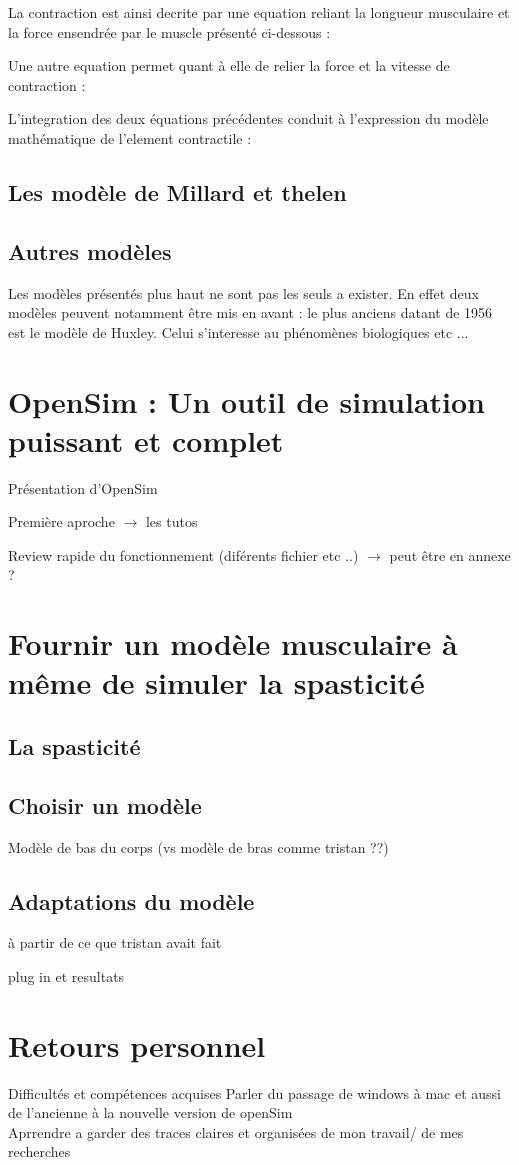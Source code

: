 La contraction est ainsi decrite par une equation reliant la longueur musculaire et la force ensendrée par le muscle présenté ci-dessous : 


Une autre equation permet quant à elle de relier la force et la vitesse de contraction : 


L'integration des deux équations précédentes conduit à l'expression du modèle mathématique de l'element contractile : 



\section{Les modèle de Millard et thelen}

\section{Autres modèles}
Les modèles présentés plus haut ne sont pas les seuls a exister. En effet deux modèles peuvent notamment être mis en avant : le plus anciens datant de 1956 est le modèle de Huxley. Celui s'interesse au phénomènes biologiques etc ... \cite{huxley_muscle_1957}
\chapter{OpenSim : Un outil de simulation puissant et complet}

Présentation d'OpenSim 

Première aproche $\rightarrow$ les tutos

Review rapide du fonctionnement (diférents fichier etc ..) $\rightarrow$ peut être en annexe ? 
\chapter{Fournir un modèle musculaire à même de simuler la spasticité}
\section{La spasticité}
\section{Choisir un modèle}
Modèle de bas du corps (vs modèle de bras comme tristan ??)
\section{Adaptations du modèle}
à partir de ce que tristan avait fait 

plug in et resultats 
\chapter{Retours personnel}
Difficultés et compétences acquises 
Parler du passage de windows à mac et aussi de l'ancienne à la nouvelle version de openSim \\

Aprrendre a garder des traces claires et organisées de mon travail/ de mes recherches 